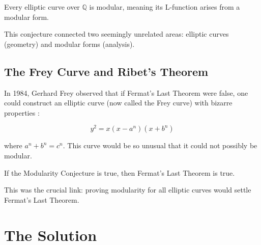 \begin{conjecture}
Every elliptic curve over $\mathbb{Q}$ is modular, meaning its L-function arises from a modular form.
\end{conjecture}

This conjecture connected two seemingly unrelated areas: elliptic curves (geometry) and modular forms (analysis).

\subsection{The Frey Curve and Ribet's Theorem}

In 1984, Gerhard Frey observed that if Fermat's Last Theorem were false, one could construct an elliptic curve (now called the Frey curve) with bizarre properties \cite{frey1984}:

\begin{equation}
y^2 = x(x - a^n)(x + b^n)
\end{equation}

where $a^n + b^n = c^n$. This curve would be so unusual that it could not possibly be modular.

\begin{theorem}
If the Modularity Conjecture is true, then Fermat's Last Theorem is true.
\end{theorem}

This was the crucial link: proving modularity for all elliptic curves would settle Fermat's Last Theorem.

\section{The Solution}

